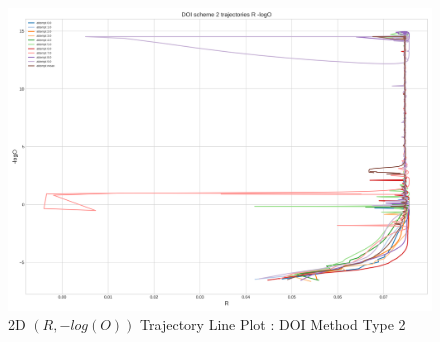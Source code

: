 \begin{figure}[H]
\begin{minipage}[t]{0.5511\textwidth}
        \includegraphics[width=\textwidth]{images/DOI scheme 2 trajectories R -logO.png}
        \captionsetup{font=tiny}
        \caption{2D $(R,-log(O))$ Trajectory Line Plot : DOI Method Type 2}
        \label{fig:corr_matrix_ts_qrt_data}
    \end{minipage}
\end{figure}

